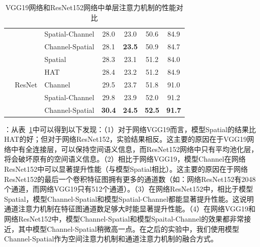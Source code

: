 \begin{table}[t]
{\begin{tabular}{|l| l |l| c c c c|}
& & Spatial-Channel &28.0 &23.0 & 50.6& 84.9\\
& & Channel-Spatial & 28.1 & \textbf{23.5} & 50.9& 84.7\\
\cline{2-7}
& \multirow{5}{*}{ResNet} & Spatial & 28.3 & 23.1 & 51.2 & 84.0 \\
&  & HAT & 28.4 & 23.2 & 51.2 & 84.9 \\
&  & Channel & 29.5 & 23.7 & 51.8 & 91.0 \\
& & Spatial-Channel &29.8 &23.9 & 52.0& 91.2\\
& & Channel-Spatial & \textbf{30.4} & \textbf{24.5} & \textbf{52.5} & \textbf{91.7}\\
\hline
\end{tabular}}
\caption{VGG19网络和ResNet152网络中单层注意力机制的性能对比} 
\label{ch5:tab:Q1}
\end{table}

\textbf{}：从表~\ref{ch5:tab:Q1}中可以得到以下发现：（1）对于网络VGG19而言，模型Spatial的结果比HAT的好；但对于网络ResNet152，实验结果相反。这主要的原因在于VGG19网络中有全连接层，可以保持空间语义信息，而ResNet152网络中只有平均池化层，将会破坏原有的空间语义信息。（2）相比于网络VGG19，模型Channel在网络ResNet152中可以显著提升性能（与模型Spatial相比）。这主要的原因在于网络ResNet152的最后一个卷积特征图拥有更多的通道数（如：网络ResNet152有2048个通道，而网络VGG19只有512个通道）。（3）在网络ResNet152中，相比于模型Spatial，模型Channel-Spatial和模型Spatial-Channel都能显著提升性能。这说明通道注意力机制在特征图通道数足够大时能显著提升性能。（4）在网络VGG19和网络ResNet152中，模型Channel-Spatial和模型Spaital-Channel的效果都非常接近，其中模型Channel-Spatial稍微高一点。在之后的实验中，我们使用模型Channel-Spatial作为空间注意力机制和通道注意力机制的融合方式。


